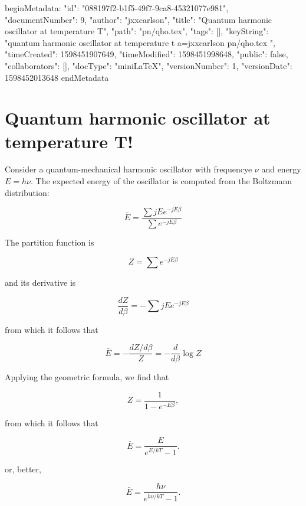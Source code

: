 beginMetadata:
{
    "id": "088197f2-b1f5-49f7-9ca8-45321077e981",
    "documentNumber": 9,
    "author": "jxxcarlson",
    "title": "Quantum harmonic oscillator at temperature T",
    "path": "pn/qho.tex",
    "tags": [],
    "keyString": "quantum harmonic oscillator at temperature t a=jxxcarlson pn/qho.tex ",
    "timeCreated": 1598451907649,
    "timeModified": 1598451998648,
    "public": false,
    "collaborators": [],
    "docType": "miniLaTeX",
    "versionNumber": 1,
    "versionDate": 1598452013648
}
endMetadata

\section{Quantum harmonic oscillator at temperature T!}

Consider a quantum-mechanical harmonic oscillator with frequencye $\nu$ and energy $E = h\nu$.  The expected energy of the oscillator is computed from the Boltzmann distribution:

\begin{equation}
\bar{E} = \frac{\sum jE e^{-jE\beta}}{\sum e^{-jE\beta}}
\end{equation}

The partition function is

\begin{equation}
Z = \sum e^{-jE\beta}
\end{equation}

and its derivative is


\begin{equation}
\frac{dZ}{d\beta} =  - \sum jE e^{-jE\beta}
\end{equation}

from which it follows that

\begin{equation}
\bar{E} = - \frac{dZ/d\beta}{Z} = - \frac{d}{d\beta} \log Z
\end{equation}

Applying the geometric formula, we find that

\begin{equation}
Z = \frac{1}{1 - e^{-E\beta}},
\end{equation}

from which it follows that

\begin{equation}
\bar{E} = \frac{E}{e^{E/kT} - 1}.
\end{equation}


or, better,


\begin{equation}
\bar{E} = \frac{h\nu}{e^{h\nu/kT} - 1}.
\end{equation}

